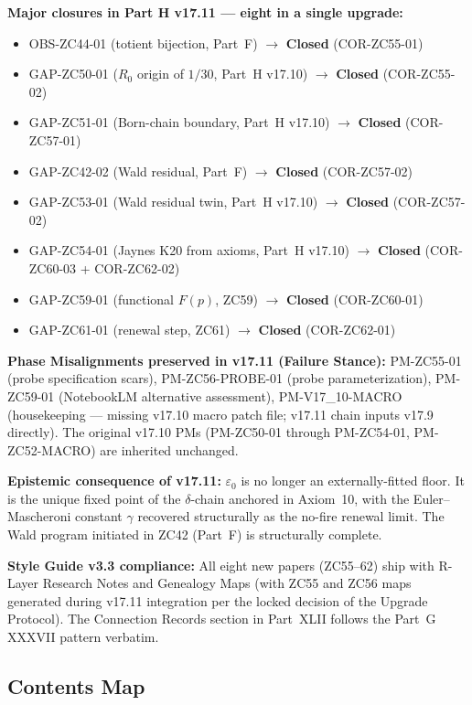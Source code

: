 \documentclass[11pt, a4paper]{article}
\begin{document}
\begin{volumebox}[title={Part H --- CRF Complete Edition v17.11
  (Parts XXXVIII--XLII, extended)}]
\textbf{Major closures in Part H v17.11 --- eight in a single upgrade:}
\begin{itemize}[noitemsep,leftmargin=1.5em]
  \item OBS-ZC44-01 (totient bijection, Part~F) $\to$ \textbf{Closed}
    (COR-ZC55-01)
  \item GAP-ZC50-01 ($R_0$ origin of $1/30$, Part~H v17.10) $\to$
    \textbf{Closed} (COR-ZC55-02)
  \item GAP-ZC51-01 (Born-chain boundary, Part~H v17.10) $\to$
    \textbf{Closed} (COR-ZC57-01)
  \item GAP-ZC42-02 (Wald residual, Part~F) $\to$ \textbf{Closed}
    (COR-ZC57-02)
  \item GAP-ZC53-01 (Wald residual twin, Part~H v17.10) $\to$
    \textbf{Closed} (COR-ZC57-02)
  \item GAP-ZC54-01 (Jaynes K20 from axioms, Part~H v17.10) $\to$
    \textbf{Closed} (COR-ZC60-03 + COR-ZC62-02)
  \item GAP-ZC59-01 (functional $F(p)$, ZC59) $\to$ \textbf{Closed}
    (COR-ZC60-01)
  \item GAP-ZC61-01 (renewal step, ZC61) $\to$ \textbf{Closed}
    (COR-ZC62-01)
\end{itemize}

\textbf{Phase Misalignments preserved in v17.11 (Failure Stance):}
PM-ZC55-01 (probe specification scars),
PM-ZC56-PROBE-01 (probe parameterization),
PM-ZC59-01 (NotebookLM alternative assessment),
PM-V17\_10-MACRO (housekeeping --- missing v17.10 macro patch file;
v17.11 chain inputs v17.9 directly).
The original v17.10 PMs (PM-ZC50-01 through PM-ZC54-01, PM-ZC52-MACRO)
are inherited unchanged.

\textbf{Epistemic consequence of v17.11:} $\varepsilon_0$ is no longer
an externally-fitted floor. It is the unique fixed point of the
$\delta$-chain anchored in Axiom~10, with the Euler--Mascheroni
constant $\gamma$ recovered structurally as the no-fire renewal limit.
The Wald program initiated in ZC42 (Part~F) is structurally complete.

\textbf{Style Guide v3.3 compliance:} All eight new papers (ZC55--62)
ship with R-Layer Research Notes and Genealogy Maps (with ZC55 and
ZC56 maps generated during v17.11 integration per the locked decision
of the Upgrade Protocol). The Connection Records section in Part~XLII
follows the Part~G XXXVII pattern verbatim.
\end{volumebox}

\subsection*{Contents Map}
\end{document}
